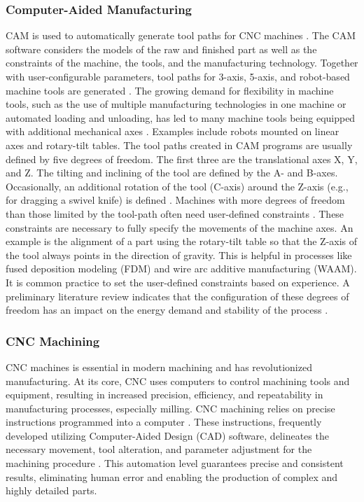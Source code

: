 \documentclass[ZLstudentexpose%
              ,optBiber%
              ,optEnglish%
              ,10pt
              ]{ZLlatex}%
\begin{document}
\subsubsection{Computer-Aided Manufacturing}\label{CAM}
CAM is used to automatically generate tool paths for CNC machines \cite{Ding.2004, Feldhausen.2022}. The CAM software considers the models of the raw and finished part as well as the constraints of the machine, the tools, and the manufacturing technology. Together with user-configurable parameters, tool paths for 3-axis, 5-axis, and robot-based machine tools are generated \cite{Nee.2015}. The growing demand for flexibility in machine tools, such as the use of multiple manufacturing technologies in one machine or automated loading and unloading, has led to many machine tools being equipped with additional mechanical axes \cite{Li.2015c,Lee.2017}. Examples include robots mounted on linear axes and rotary-tilt tables.
The tool paths created in CAM programs are usually defined by five degrees of freedom. The first three are the translational axes X, Y, and Z. The tilting and inclining of the tool are defined by the A- and B-axes. Occasionally, an additional rotation of the tool (C-axis) around the Z-axis (e.g., for dragging a swivel knife) is defined \cite{Zhu.2012}. Machines with more degrees of freedom than those limited by the tool-path often need user-defined constraints \cite{Pan}. These constraints are necessary to fully specify the movements of the machine axes. An example is the alignment of a part using the rotary-tilt table so that the Z-axis of the tool always points in the direction of gravity. This is helpful in processes like fused deposition modeling (FDM) and wire arc additive manufacturing (WAAM). 
It is common practice to set the user-defined constraints based on experience. A preliminary literature review indicates that the configuration of these degrees of freedom has an impact on the energy demand and stability of the process \cite{Paryanto.2015,Hirzinger.2005, Pham.2018,Cvitanic.2020}. 
\newpage



\subsubsection{CNC Machining}
CNC machines is essential in modern machining and has revolutionized manufacturing. At its core, CNC uses computers to control machining tools and equipment, resulting in increased precision, efficiency, and repeatability in manufacturing processes, especially milling. CNC machining relies on precise instructions programmed into a computer \cite{Altintas.2001}. These instructions, frequently developed utilizing Computer-Aided Design (CAD) software, delineates the necessary movement, tool alteration, and parameter adjustment for the machining procedure \cite{Klancnik.2016}. This automation level guarantees precise and consistent results, eliminating human error and enabling the production of complex and highly detailed parts.
\end{document}
